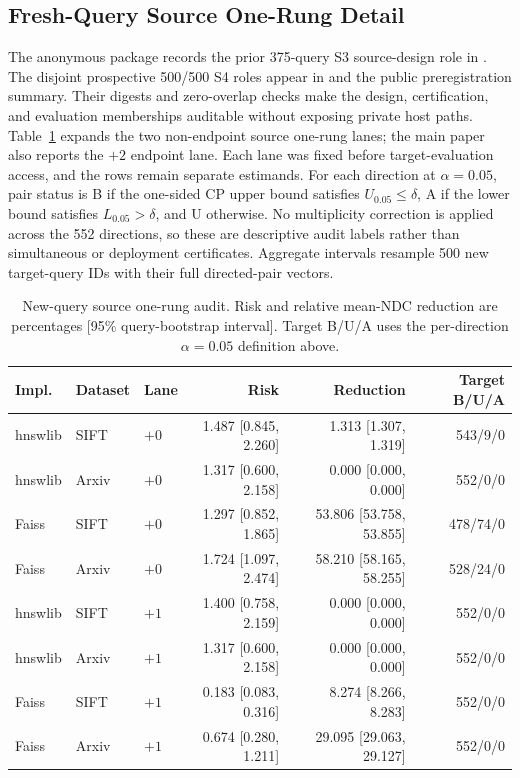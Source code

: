\documentclass[sigconf,anonymous]{acmart}
\begin{document}
\subsection{Fresh-Query Source One-Rung Detail}
The anonymous package records the prior 375-query S3 source-design role in . The disjoint prospective 500/500 S4 roles appear in  and the public preregistration summary. Their digests and zero-overlap checks make the design, certification, and evaluation memberships auditable without exposing private host paths.
Table~\ref{tab:fresh-detail} expands the two non-endpoint source one-rung lanes; the main paper also reports the $+2$ endpoint lane. Each lane was fixed before target-evaluation access, and the rows remain separate estimands. For each direction at $\alpha=0.05$, pair status is B if the one-sided CP upper bound satisfies $U_{0.05}\leq\delta$, A if the lower bound satisfies $L_{0.05}>\delta$, and U otherwise. No multiplicity correction is applied across the 552 directions, so these are descriptive audit labels rather than simultaneous or deployment certificates. Aggregate intervals resample 500 new target-query IDs with their full directed-pair vectors.

\begin{table}[t]
\caption{New-query source one-rung audit. Risk and relative mean-NDC reduction are percentages [95\% query-bootstrap interval]. Target B/U/A uses the per-direction $\alpha=0.05$ definition above.}
\label{tab:fresh-detail}
\small\begin{tabular*}{\textwidth}{@{\extracolsep{\fill}}lllrrr@{}}\toprule
Impl. & Dataset & Lane & Risk & Reduction & Target B/U/A\\\midrule
hnswlib & SIFT & $+0$ & 1.487 [0.845, 2.260] & 1.313 [1.307, 1.319] & 543/9/0\\
hnswlib & Arxiv & $+0$ & 1.317 [0.600, 2.158] & 0.000 [0.000, 0.000] & 552/0/0\\
Faiss & SIFT & $+0$ & 1.297 [0.852, 1.865] & 53.806 [53.758, 53.855] & 478/74/0\\
Faiss & Arxiv & $+0$ & 1.724 [1.097, 2.474] & 58.210 [58.165, 58.255] & 528/24/0\\
hnswlib & SIFT & $+1$ & 1.400 [0.758, 2.159] & 0.000 [0.000, 0.000] & 552/0/0\\
hnswlib & Arxiv & $+1$ & 1.317 [0.600, 2.158] & 0.000 [0.000, 0.000] & 552/0/0\\
Faiss & SIFT & $+1$ & 0.183 [0.083, 0.316] & 8.274 [8.266, 8.283] & 552/0/0\\
Faiss & Arxiv & $+1$ & 0.674 [0.280, 1.211] & 29.095 [29.063, 29.127] & 552/0/0\\\bottomrule
\end{tabular*}
\end{table}
\end{document}
